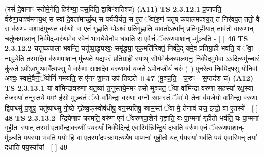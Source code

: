 \documentclass[17pt]{extarticle}
\begin{document}
                  \newline
                      (रसं॑-दे॒वानाꣳ॒॒-स्तोमे॒नेति॒-हिर॑ण्या॒-दस॒दिति॒-द्वाविꣳ॑शतिश्च) \textbf{(A11)} \newline \newline
                                        \textbf{ TS 2.3.12.1} \newline
                  प्र॒जाप॑ति॒ र्वरु॑णा॒याश्व॑मनय॒थ् स स्वां दे॒वता॑मार्च्छ॒थ् स पर्य॑दीर्यत॒ स ए॒तं ॅवा॑रु॒णं चतु॑ष्-कपालमपश्य॒त् तं निर॑वप॒त् ततो॒ वै स व॑रुण- पा॒शाद॑मुच्यत॒ वरु॑णो॒ वा ए॒तं गृ॑ह्णाति॒ योऽश्वं॑ प्रतिगृ॒ह्णाति॒ याव॒तोऽश्वा᳚न् प्रतिगृह्णी॒यात् ताव॑तो वारु॒णान् चतु॑ष्कपाला॒न् निर्व॑पे॒द्-वरु॑णमे॒व स्वेन॑ भाग॒धेये॒नोप॑ धावति॒ स ए॒वैनं॑ ॅवरुणपा॒शान् -मु॑ञ्चति॒ - [  ] \textbf{  46} \newline
                  \newline
                                \textbf{ TS 2.3.12.2} \newline
                  चतु॑ष्कपाला भवन्ति॒ चतु॑ष्पा॒द्ध्यश्वः॒ समृ॑द्ध्या॒ एक॒मति॑रिक्तं॒ निर्व॑पे॒द्-यमे॒व प्र॑तिग्रा॒ही भव॑ति॒ यं ॅवा॒ नाद्ध्येति॒ तस्मा॑दे॒व व॑रुणपा॒शान् मु॑च्यते॒ यद्यप॑रं प्रतिग्रा॒ही स्याथ् सौ॒र्यमेक॑कपाल॒मनु॒ निर्व॑पेद॒मुमे॒वा ऽऽदि॒त्यमु॑च्चा॒रं कु॑रुते॒ ऽपो॑ऽवभृ॒थमवै᳚त्य॒फ्सु वै वरु॑णः सा॒क्षादे॒व वरु॑ण॒मव॑ यजते ऽपोन॒प्त्रीयं॑ च॒रुं ( ) पुन॒रेत्य॒ निर्व॑पेद॒फ्सु यो॑नि॒र्वा अश्वः॒ स्वामे॒वैनं॒ॅयोनिं॑ गमयति॒ स ए॑नꣳ शा॒न्त उप॑ तिष्ठते ॥ \textbf{  47 } \newline
                  \newline
                      (मु॒ञ्च॒ति॒ - च॒रुꣳ - स॒प्तद॑श च)  \textbf{(A12)} \newline \newline
                                        \textbf{ TS 2.3.13.1} \newline
                  या वा॑मिन्द्रावरुणा यत॒व्या॑ त॒नूस्तये॒ममꣳ ह॑सो मुञ्चतं॒ ॅया वा॑मिन्द्रा वरुणा सह॒स्या॑ रक्ष॒स्या॑ तेज॒स्या॑ त॒नूस्तये॒ ममꣳ ह॑सो मुञ्चतं॒ ॅयो वा॑मिन्द्रा वरुणा व॒ग्नौ स्राम॒स्तं ॅवा॑ मे॒ तेना व॑यजे॒यो वा॑मिन्द्रा वरुणा द्वि॒पाथ्सु॑ प॒शुषु॒ चतु॑ष्पाथ्सु गो॒ष्ठे गृ॒हेष्व॒फ्‌स्वोष॑धीषु॒ वन॒स्पति॑षु॒ स्राम॒स्तं ॅवा॑ मे॒ तेनाव॑ यज॒ इन्द्रो॒ वा ए॒तस्ये᳚ - [  ] \textbf{  48} \newline
                  \newline
                                \textbf{ TS 2.3.13.2} \newline
                  -न्द्रि॒येणाप॑ क्रामति॒ वरु॑ण एनं ॅवरुणपा॒शेन॑ गृह्णाति॒ यः पा॒प्मना॑ गृही॒तो भव॑ति॒ यः पा॒प्मना॑ गृही॒तः स्यात् तस्मा॑ ए॒तामै᳚न्द्रावरु॒णीं प॑य॒स्यां᳚ निर्व॑पे॒दिन्द्र॑ ए॒वास्मि॑न्निन्द्रि॒यं द॑धाति॒ वरु॑ण एनं ॅवरुणपा॒शान्-मु॑ञ्चति पय॒स्या॑ भवति॒ पयो॒ हि वा ए॒तस्मा॑दप॒क्राम॒त्यथै॒ष पा॒प्मना॑ गृही॒तो यत् प॑य॒स्या॑ भव॑ति॒ पय॑ ए॒वास्मि॒न् तया॑ दधाति पय॒स्या॑यां - [  ] \textbf{  49} \newline
\end{document}

